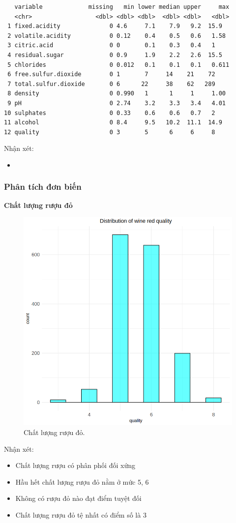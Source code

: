 \begin{lstlisting}
   variable             missing   min lower median upper     max
   <chr>                  <dbl> <dbl> <dbl>  <dbl> <dbl>   <dbl>
 1 fixed.acidity              0 4.6     7.1    7.9   9.2  15.9  
 2 volatile.acidity           0 0.12    0.4    0.5   0.6   1.58 
 3 citric.acid                0 0       0.1    0.3   0.4   1    
 4 residual.sugar             0 0.9     1.9    2.2   2.6  15.5  
 5 chlorides                  0 0.012   0.1    0.1   0.1   0.611
 6 free.sulfur.dioxide        0 1       7     14    21    72    
 7 total.sulfur.dioxide       0 6      22     38    62   289    
 8 density                    0 0.990   1      1     1     1.00 
 9 pH                         0 2.74    3.2    3.3   3.4   4.01 
10 sulphates                  0 0.33    0.6    0.6   0.7   2    
11 alcohol                    0 8.4     9.5   10.2  11.1  14.9  
12 quality                    0 3       5      6     6     8   
\end{lstlisting}
Nhận xét:
\begin{itemize}
    \item 
\end{itemize}

\subsubsection{Phân tích đơn biến}

\textbf{Chất lượng rượu đỏ}
\begin{figure}[H]
    \centering
    \includegraphics[width=0.75\columnwidth]{wine_figures/red_quality.png}
    \caption{Chất lượng rượu đỏ.}
    \label{fig:red_quality}
\end{figure}
Nhận xét:
\begin{itemize}
    \item Chất lượng rượu có phân phối đối xứng 
    \item Hầu hết chất lượng rượu đỏ nằm ở mức 5, 6
    \item Không có rượu đỏ nào đạt điểm tuyệt đối
    \item Chất lượng rượu đỏ tệ nhất có điểm số là 3
\end{itemize}

